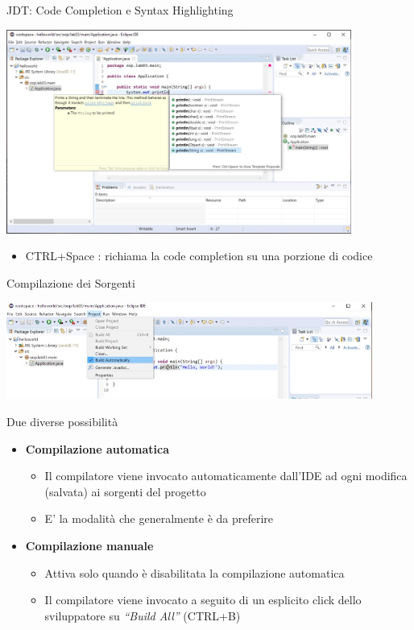 \documentclass[xcolor=dvipsnames,presentation]{beamer}
\begin{document}
\begin{frame}{JDT: Code Completion e Syntax Highlighting}
\begin{center}
\includegraphics[width=0.85\textwidth]{img/eclipse-screenshots/eclipse-ide-03.jpg}
\end{center}
\begin{itemize}
\item CTRL+Space : richiama la code completion su una porzione di codice
\end{itemize}
\end{frame}

\begin{frame}{Compilazione dei Sorgenti}
\begin{center}
\includegraphics[width=0.9\textwidth]{img/eclipse-screenshots/eclipse-ide-04a.jpg}
\end{center}
\begin{block}{Due diverse possibilità}
\begin{itemize}
\item \textbf{Compilazione automatica}
\begin{itemize}
\item Il compilatore viene invocato automaticamente dall'IDE ad ogni modifica (salvata) ai sorgenti del progetto
\item E' la modalità che generalmente è da preferire
\end{itemize}
\item \textbf{Compilazione manuale}
\begin{itemize}
\item Attiva solo quando è disabilitata la compilazione automatica
\item Il compilatore viene invocato a seguito di un esplicito click dello sviluppatore su \textit{``Build All''} (CTRL+B)
\end{itemize}
\end{itemize}
\end{block}
\end{frame}
\end{document}
